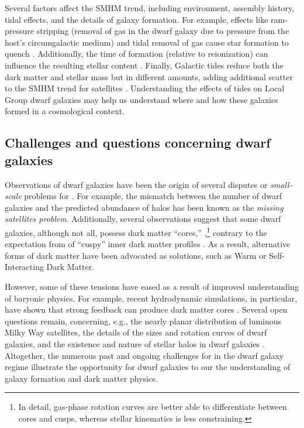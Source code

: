 Several factors affect the SMHM trend, including environment, assembly
history, tidal effects, and the details of galaxy formation. For
example, effects like ram-pressure stripping (removal of gas in the
dwarf galaxy due to pressure from the host's circumgalactic medium) and
tidal removal of gas cause star formation to quench
\citep[e.g.,][]{christensen+2024}. Additionally, the time of formation
(relative to reionization) can influence the resulting stellar content
\citep{kim+2024}. Finally, Galactic tides reduce both the dark matter
and stellar mass but in different amounts, adding additional scatter to
the SMHM trend for satellites \citep[e.g.,][]{PNM2008, fattahi+2018}.
Understanding the effects of tides on Local Group dwarf galaxies may
help us understand where and how these galaxies formed in a cosmological
context.

\subsection{Challenges and questions concerning dwarf
galaxies}\label{challenges-and-questions-concerning-dwarf-galaxies}

Observations of dwarf galaxies have been the origin of several disputes
or \emph{small-scale} problems for \LCDM{} \citep[see reviews
by][]{bullock+boylan-kolchin2017, sales+2022}. For example, the mismatch
between the number of dwarf galaxies and the predicted abundance of
\LCDM{} halos has been known as the \emph{missing satellites problem}.
Additionally, several observations suggest that some dwarf galaxies,
although not all, possess dark matter ``cores,''
\citep[e.g.,][]{moore1994, adams+2014, oh+2015, walker+penarrubia2011, read+walker+steger2019},\footnote{In
  detail, gas-phase rotation curves are better able to differentiate
  between cores and cusps, whereas stellar kinematics is less
  constraining.} contrary to the expectation from \LCDM{} of ``cuspy''
inner dark matter profiles \citep{NFW1996, NFW1997}. As a result,
alternative forms of dark matter have been advocated as solutions, such
as Warm or Self-Interacting Dark Matter.

However, some of these tensions have eased as a result of improved
understanding of baryonic physics. For example, recent hydrodynamic
simulations, in particular, have shown that strong feedback can produce
dark matter cores
\citetext{\citealp[e.g.,][\citet{tollet+2016}]{navarro+eke+frenk1996}; \citealp{fitts+2017}; \citealp{benitez-llambay+2019}; \citealp{orkney+2021}}.
Several open questions remain, concerning, e.g., the nearly planar
distribution of luminous Milky Way satellites, the details of the sizes
and rotation curves of dwarf galaxies, and the existence and nature of
stellar halos in dwarf galaxies \citep[e.g.,][]{sales+2022}. Altogether,
the numerous past and ongoing challenges for \LCDM{} in the dwarf galaxy
regime illustrate the opportunity for dwarf galaxies to our the
understanding of galaxy formation and dark matter physics.


